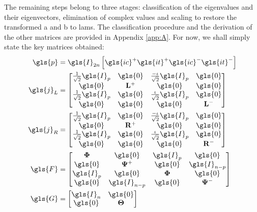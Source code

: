 The remaining steps belong to three stages: classification of the eigenvalues
and their eigenvectors, elimination of complex values and scaling to restore
the transformed \gls{a} and \gls{b} to \glspl{lam}. The classification procedure 
and the derivation of the other matrices are provided in Appendix \autoref{app:A}.
For now, we shall simply state the key matrices obtained:
\begin{subequations}
\label{eqn:pjfg}
\begin{align}
	\gls{p} &= \gls{I}_{2n}\left[\gls{ic}^+\gls{it}^+\gls{ic}^-\gls{it}^-\right]\\
%	
	\gls{j}_L &= \begin{bmatrix}
		\frac{1}{\sqrt{2}}\gls{I}_p & \gls{0} & \frac{-\iota}{\sqrt{2}}\gls{I}_p & \gls{0}\\
		\gls{0} & \mathbf{L}^+ & \gls{0} & \gls{0} \\
		\frac{1}{\sqrt{2}}\gls{I}_p & \gls{0} & \frac{\iota}{\sqrt{2}}\gls{I}_p & \gls{0}\\
		\gls{0} & \gls{0} & \gls{0} & \mathbf{L}^- \\
	\end{bmatrix}\\ 
	\gls{j}_R &= \begin{bmatrix}
		\frac{1}{\sqrt{2}}\gls{I}_p & \gls{0} & \frac{-\iota}{\sqrt{2}}\gls{I}_p & \gls{0}\\
		\gls{0} & \mathbf{R}^+ & \gls{0} & \gls{0} \\
		\frac{1}{\sqrt{2}}\gls{I}_p & \gls{0} & \frac{\iota}{\sqrt{2}}\gls{I}_p & \gls{0}\\
		\gls{0} & \gls{0} & \gls{0} & \mathbf{R}^- \\
	\end{bmatrix}\\
%
	\gls{F} &= \begin{bmatrix}
		\mathbf{\Phi} & \gls{0} & \gls{I}_{p} & \gls{0} \\
		\gls{0} & \mathbf{\Psi}^+ & \gls{0} & \gls{I}_{n-p} \\
		\gls{I}_{p} & \gls{0} & \mathbf{\Phi} & \gls{0} \\
		\gls{0} & \gls{I}_{n-p} & \gls{0} & \mathbf{\Psi}^-
	\end{bmatrix}\\
%
	\gls{G} &= \begin{bmatrix}
	\gls{I}_n & \gls{0} \\
	\gls{0} & \mathbf{\Theta}
	\end{bmatrix}
\end{align}
\end{subequations}
